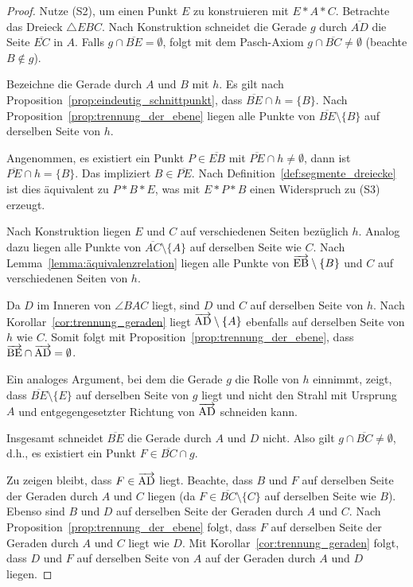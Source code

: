 \documentclass[a4paper,12pt]{article}
\theoremstyle{break}
\begin{document}
\begin{proof}
Nutze (S2), um einen Punkt $E$ zu konstruieren mit $E * A * C$. Betrachte das Dreieck $\triangle EBC$. Nach Konstruktion schneidet die Gerade $g$ durch $\overline{AD}$ die Seite $\overline{EC}$ in $A$. Falls $g \cap \overline{BE} = \emptyset$, folgt mit dem Pasch-Axiom $g \cap \overline{BC} \neq \emptyset$ (beachte $B \notin g$).

Bezeichne die Gerade durch $A$ und $B$ mit $h$. Es gilt nach Proposition~\ref{prop:eindeutig_schnittpunkt}, dass $\overline{BE} \cap h = \{B\}$. Nach Proposition~\ref{prop:trennung_der_ebene} liegen alle Punkte von $\overline{BE} \setminus \{B\}$ auf derselben Seite von $h$. 

Angenommen, es existiert ein Punkt $P \in \overline{EB}$ mit $\overline{PE} \cap h \neq \emptyset$, dann ist $\overline{PE} \cap h = \{B\}$. Das impliziert $B \in \overline{PE}$. Nach Definition~\ref{def:segmente_dreiecke} ist dies äquivalent zu $P * B * E$, was mit $E * P * B$ einen Widerspruch zu (S3) erzeugt.

Nach Konstruktion liegen $E$ und $C$ auf verschiedenen Seiten bezüglich $h$. Analog dazu liegen alle Punkte von $\overline{AC} \setminus \{A\}$ auf derselben Seite wie $C$. Nach Lemma~\ref{lemma:äquivalenzrelation} liegen alle Punkte von $\overrightarrow{\rm EB} \setminus \{B\}$ und $C$ auf verschiedenen Seiten von $h$.

Da $D$ im Inneren von $\angle BAC$ liegt, sind $D$ und $C$ auf derselben Seite von $h$. Nach Korollar~\ref{cor:trennung_geraden} liegt $\overrightarrow{\rm AD} \setminus \{A\}$ ebenfalls auf derselben Seite von $h$ wie $C$. Somit folgt mit Proposition~\ref{prop:trennung_der_ebene}, dass $\overrightarrow{\rm BE} \cap \overrightarrow{\rm AD} = \emptyset$.

Ein analoges Argument, bei dem die Gerade $g$ die Rolle von $h$ einnimmt, zeigt, dass $\overline{BE} \setminus \{E\}$ auf derselben Seite von $g$ liegt und nicht den Strahl mit Ursprung $A$ und entgegengesetzter Richtung von $\overrightarrow{\rm AD}$ schneiden kann. 

Insgesamt schneidet $\overline{BE}$ die Gerade durch $A$ und $D$ nicht. Also gilt $g \cap \overline{BC} \neq \emptyset$, d.h., es existiert ein Punkt $F \in \overline{BC} \cap g$.

Zu zeigen bleibt, dass $F \in \overrightarrow{\rm AD}$ liegt. Beachte, dass $B$ und $F$ auf derselben Seite der Geraden durch $A$ und $C$ liegen (da $F \in \overline{BC} \setminus \{C\}$ auf derselben Seite wie $B$). Ebenso sind $B$ und $D$ auf derselben Seite der Geraden durch $A$ und $C$. Nach Proposition~\ref{prop:trennung_der_ebene} folgt, dass $F$ auf derselben Seite der Geraden durch $A$ und $C$ liegt wie $D$. Mit Korollar~\ref{cor:trennung_geraden} folgt, dass $D$ und $F$ auf derselben Seite von $A$ auf der Geraden durch $A$ und $D$ liegen.
\end{proof}
\end{document}
